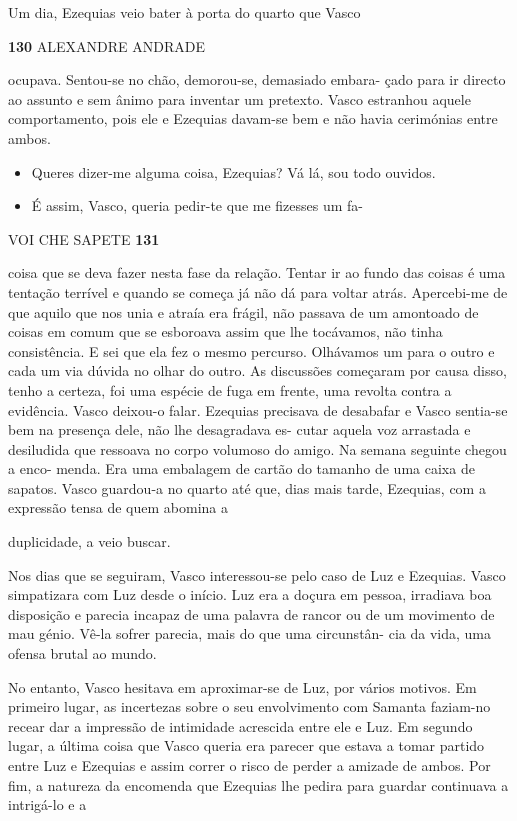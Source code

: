 Um dia, Ezequias veio bater à porta do quarto que Vasco

\textbf{130 }ALEXANDRE ANDRADE

ocupava. Sentou-se no chão, demorou-se, demasiado embara- çado para ir
directo ao assunto e sem ânimo para inventar um pretexto. Vasco
estranhou aquele comportamento, pois ele e Ezequias davam-se bem e não
havia cerimónias entre ambos.

\begin{itemize}
\tightlist
\item
  Queres dizer-me alguma coisa, Ezequias? Vá lá, sou todo ouvidos.
\item
  É assim, Vasco, queria pedir-te que me fizesses um fa-
\end{itemize}

VOI CHE SAPETE \textbf{131}

coisa que se deva fazer nesta fase da relação. Tentar ir ao fundo das
coisas é uma tentação terrível e quando se começa já não dá para voltar
atrás. Apercebi-me de que aquilo que nos unia e atraía era frágil, não
passava de um amontoado de coisas em comum que se esboroava assim que
lhe tocávamos, não tinha consistência. E sei que ela fez o mesmo
percurso. Olhávamos um para o outro e cada um via dúvida no olhar do
outro. As discussões começaram por causa disso, tenho a certeza, foi uma
espécie de fuga em frente, uma revolta contra a evidência. Vasco
deixou-o falar. Ezequias precisava de desabafar e Vasco sentia-se bem na
presença dele, não lhe desagradava es- cutar aquela voz arrastada e
desiludida que ressoava no corpo volumoso do amigo. Na semana seguinte
chegou a enco- menda. Era uma embalagem de cartão do tamanho de uma
caixa de sapatos. Vasco guardou-a no quarto até que, dias mais tarde,
Ezequias, com a expressão tensa de quem abomina a

duplicidade, a veio buscar.

Nos dias que se seguiram, Vasco interessou-se pelo caso de Luz e
Ezequias. Vasco simpatizara com Luz desde o início. Luz era a doçura em
pessoa, irradiava boa disposição e parecia incapaz de uma palavra de
rancor ou de um movimento de mau génio. Vê-la sofrer parecia, mais do
que uma circunstân- cia da vida, uma ofensa brutal ao mundo.

No entanto, Vasco hesitava em aproximar-se de Luz, por vários motivos.
Em primeiro lugar, as incertezas sobre o seu envolvimento com Samanta
faziam-no recear dar a impressão de intimidade acrescida entre ele e
Luz. Em segundo lugar, a última coisa que Vasco queria era parecer que
estava a tomar partido entre Luz e Ezequias e assim correr o risco de
perder a amizade de ambos. Por fim, a natureza da encomenda que Ezequias
lhe pedira para guardar continuava a intrigá-lo e a

